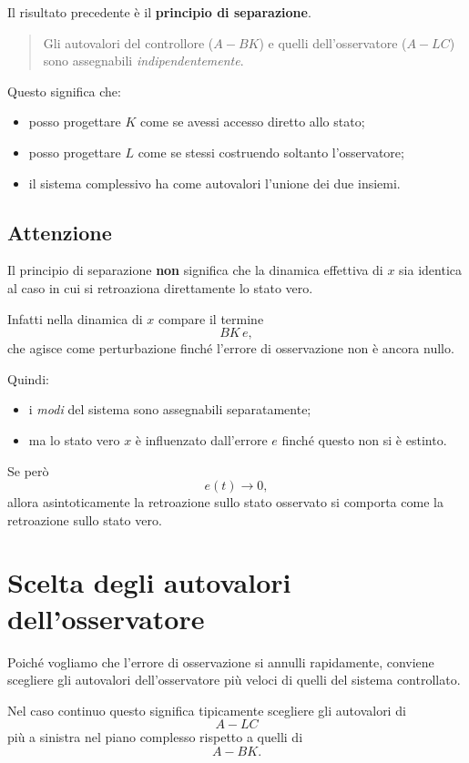 Il risultato precedente è il \textbf{principio di separazione}.

\begin{quote}
Gli autovalori del controllore (\(A-BK\)) e quelli dell'osservatore (\(A-LC\))
sono assegnabili \emph{indipendentemente}.
\end{quote}

Questo significa che:
\begin{itemize}
    \item posso progettare \(K\) come se avessi accesso diretto allo stato;
    \item posso progettare \(L\) come se stessi costruendo soltanto l'osservatore;
    \item il sistema complessivo ha come autovalori l'unione dei due insiemi.
\end{itemize}

\subsection*{Attenzione}

Il principio di separazione \textbf{non} significa che la dinamica effettiva di \(x\)
sia identica al caso in cui si retroaziona direttamente lo stato vero.

Infatti nella dinamica di \(x\) compare il termine
\[
BK\,e,
\]
che agisce come perturbazione finché l'errore di osservazione non è ancora nullo.

Quindi:
\begin{itemize}
    \item i \emph{modi} del sistema sono assegnabili separatamente;
    \item ma lo stato vero \(x\) è influenzato dall'errore \(e\) finché questo non si è estinto.
\end{itemize}

Se però
\[
e(t)\to 0,
\]
allora asintoticamente la retroazione sullo stato osservato si comporta come
la retroazione sullo stato vero.

\section{Scelta degli autovalori dell'osservatore}

Poiché vogliamo che l'errore di osservazione si annulli rapidamente,
conviene scegliere gli autovalori dell'osservatore più veloci di quelli del sistema controllato.

Nel caso continuo questo significa tipicamente scegliere gli autovalori di
\[
A-LC
\]
più a sinistra nel piano complesso rispetto a quelli di
\[
A-BK.
\]

